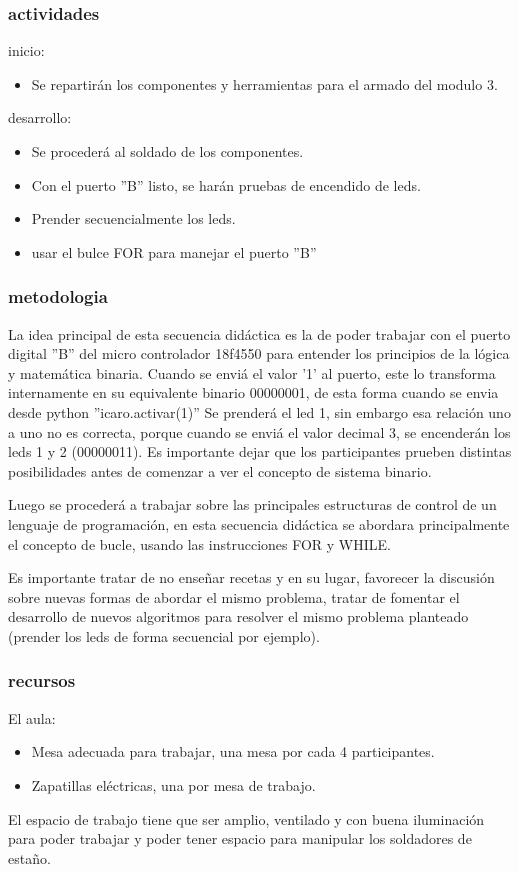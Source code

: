 \subsubsection{actividades}
inicio:
\begin{itemize}
  \item Se repartirán los componentes y herramientas para el armado del modulo 3.

\end{itemize}
desarrollo:
\begin{itemize}
  \item Se procederá al soldado de los componentes. 
  \item Con el puerto ''B'' listo, se harán pruebas de encendido de leds. 
  \item Prender secuencialmente los leds.
  \item usar el bulce FOR para manejar el puerto ''B''
\end{itemize}

\subsubsection{metodologia}

La idea principal de esta secuencia didáctica es la de poder trabajar con el puerto digital ''B'' del micro controlador 18f4550 para entender los principios de la lógica y matemática binaria.
Cuando se enviá el valor '1' al puerto, este lo transforma internamente en su equivalente binario 00000001, de esta forma cuando se envia desde python ''icaro.activar(1)'' Se prenderá el led 1, sin embargo esa relación uno a uno no es correcta, porque cuando se enviá el valor decimal 3, se encenderán los leds 1 y 2 (00000011). Es importante dejar que los participantes prueben distintas posibilidades antes de comenzar a ver el concepto de sistema binario.

Luego se procederá a trabajar sobre las principales estructuras de control de un lenguaje de programación, en esta secuencia didáctica se abordara principalmente el concepto de bucle, usando las instrucciones FOR y WHILE.

Es importante tratar de no enseñar recetas y en su lugar, favorecer la discusión sobre nuevas formas de abordar el mismo problema, tratar de fomentar el desarrollo de nuevos algoritmos para resolver el mismo problema planteado (prender los leds de forma secuencial por ejemplo).

\subsubsection{recursos}
El aula:
\begin{itemize}
  \item Mesa adecuada para trabajar, una mesa por cada 4 participantes.
  \item Zapatillas eléctricas, una por mesa de trabajo.
\end{itemize}
El espacio de trabajo tiene que ser amplio, ventilado y con buena iluminación para poder trabajar y poder tener espacio para manipular los soldadores de estaño.    

